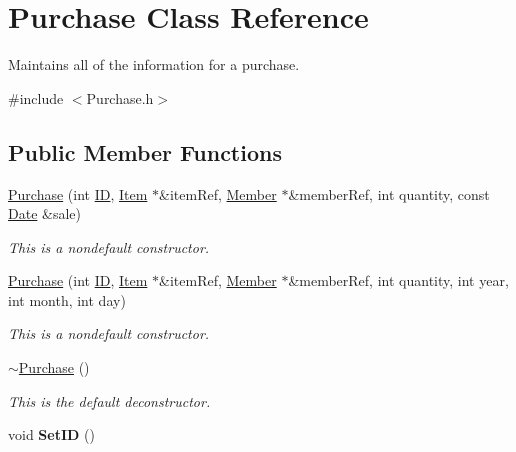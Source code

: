 \hypertarget{class_purchase}{}\section{Purchase Class Reference}
\label{class_purchase}


Maintains all of the information for a purchase.  




{\ttfamily \#include $<$Purchase.\+h$>$}

\subsection*{Public Member Functions}
\begin{DoxyCompactItemize}
\item 
\hyperlink{class_purchase_ad08eb8e99875d8973ecbeea1da3e175e}{Purchase} (int \hyperlink{class_purchase_ac11c5f5772648b8e5a8e1dd370982720}{ID}, \hyperlink{class_item}{Item} $\ast$\&item\+Ref, \hyperlink{class_member}{Member} $\ast$\&member\+Ref, int quantity, const \hyperlink{class_date}{Date} \&sale)
\begin{DoxyCompactList}\small\item\em This is a nondefault constructor. \end{DoxyCompactList}\item 
\hyperlink{class_purchase_a075ce333db37c0005559a4dac7afb32a}{Purchase} (int \hyperlink{class_purchase_ac11c5f5772648b8e5a8e1dd370982720}{ID}, \hyperlink{class_item}{Item} $\ast$\&item\+Ref, \hyperlink{class_member}{Member} $\ast$\&member\+Ref, int quantity, int year, int month, int day)
\begin{DoxyCompactList}\small\item\em This is a nondefault constructor. \end{DoxyCompactList}\item 
\hyperlink{class_purchase_a8ebd6efb2177df6d10fcba514095915f}{$\sim$\+Purchase} ()
\begin{DoxyCompactList}\small\item\em This is the default deconstructor. \end{DoxyCompactList}\item 
void {\bfseries Set\+ID} ()\hypertarget{class_purchase_ac23880f64fed84e2237e748bfda10acd}{}\label{class_purchase_ac23880f64fed84e2237e748bfda10acd}


\end{DoxyCompactItemize}
